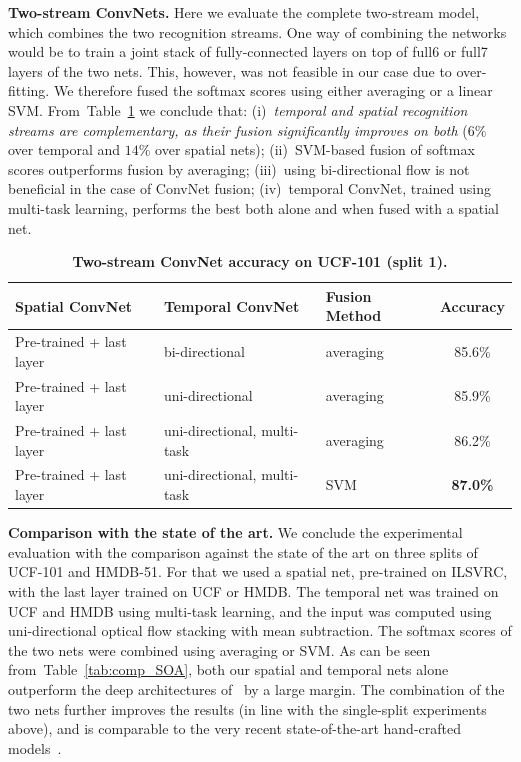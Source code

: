 \documentclass{article} %
\newcommand{\tblref}[1]{Table~\ref{#1}}
\begin{document}
\noindent\textbf{Two-stream ConvNets.}
Here we evaluate the complete two-stream model, which combines the two recognition streams. 
One way of combining the networks would be to train a joint stack of fully-connected layers on top of full6 or full7 layers of the two nets.
This, however, was not feasible in our case due to over-fitting. We therefore fused the softmax scores using either averaging or a linear SVM.
From~\tblref{tab:fusion} we conclude that: 
(i)~\emph{temporal and spatial recognition streams are complementary, as their fusion significantly improves on both} ($6\%$ over temporal and $14\%$ over spatial nets);
(ii)~SVM-based fusion of softmax scores outperforms fusion by averaging;
(iii)~using bi-directional flow is not beneficial in the case of ConvNet fusion; 
(iv)~temporal ConvNet, trained using multi-task learning, performs the best both alone and when fused with a spatial net.
\begin{table}[ht]
\small
\centering
\caption{\textbf{Two-stream ConvNet accuracy on UCF-101 (split 1).}
}
\begin{tabular}{|l|l|l|c|} \hline
Spatial ConvNet & Temporal ConvNet & Fusion Method & Accuracy \\ \hline
Pre-trained + last layer & bi-directional & averaging & 85.6\% \\ \hline
Pre-trained + last layer & uni-directional & averaging & 85.9\%  \\ \hline
Pre-trained + last layer & uni-directional, multi-task & averaging  & 86.2\% \\ \hline
Pre-trained + last layer & uni-directional, multi-task & SVM & \textbf{87.0\%} \\ \hline
\end{tabular}
\label{tab:fusion}
\end{table}

\noindent\textbf{Comparison with the state of the art.}
We conclude the experimental evaluation with the comparison against the state of the art on three splits of UCF-101 and HMDB-51.
For that we used a spatial net, pre-trained on ILSVRC, with the last layer trained on UCF or HMDB. 
The temporal net was trained on UCF and HMDB using multi-task learning, and the input was computed using uni-directional optical flow stacking with 
mean subtraction. The softmax scores of the two nets were combined using averaging or SVM.
As can be seen from~\tblref{tab:comp_SOA}, both our spatial and temporal nets alone outperform the deep architectures of~\cite{Karpathy14,Kuehne11} by a large margin.
The combination of the two nets further improves the results (in line with the single-split experiments above), and is comparable to the very recent 
state-of-the-art hand-crafted models~\cite{Wang13b,Peng14,Peng14a}.
\end{document}
